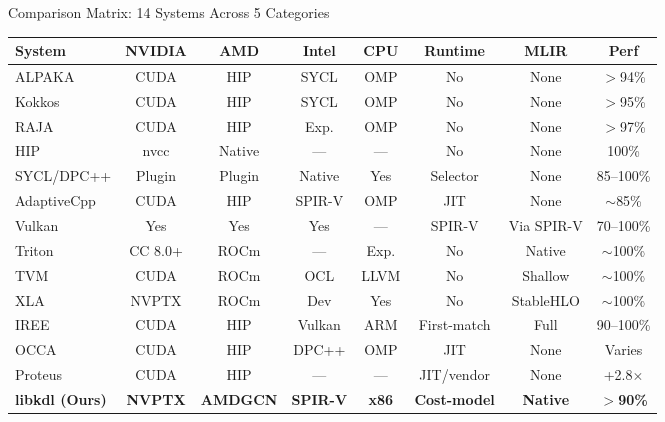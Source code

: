 \documentclass[aspectratio=169,10pt]{beamer}
\begin{document}
\begin{frame}{Comparison Matrix: 14 Systems Across 5 Categories}
  \begin{center}
  \begin{adjustbox}{max width=\textwidth,max height=0.78\textheight}
  \begin{tabular}{@{}l c c c c c c c@{}}
    \toprule
    \textbf{System} & \textbf{NVIDIA} & \textbf{AMD} & \textbf{Intel} & \textbf{CPU} & \textbf{Runtime} & \textbf{MLIR} & \textbf{Perf} \\
    \midrule

    ALPAKA       & CUDA     & HIP    & SYCL  & OMP   & No           & None    & $>$94\%  \\
    Kokkos       & CUDA     & HIP    & SYCL  & OMP   & No           & None    & $>$95\%  \\

    RAJA         & CUDA     & HIP    & Exp.  & OMP   & No           & None    & $>$97\%  \\
    HIP          & nvcc     & Native & ---   & ---   & No           & None    & 100\%  \\
    \midrule

    SYCL/DPC++   & Plugin   & Plugin & Native & Yes  & Selector     & None    & 85--100\% \\
    AdaptiveCpp  & CUDA     & HIP    & SPIR-V & OMP  & JIT          & None    & $\sim$85\%  \\

    Vulkan       & Yes      & Yes    & Yes   & ---   & SPIR-V       & Via SPIR-V & 70--100\% \\
    \midrule
    Triton       & CC 8.0+  & ROCm   & ---   & Exp.  & No           & Native  & $\sim$100\% \\

    TVM          & CUDA     & ROCm   & OCL   & LLVM  & No           & Shallow & $\sim$100\% \\
    XLA          & NVPTX    & ROCm   & Dev   & Yes   & No           & StableHLO & $\sim$100\% \\

    IREE         & CUDA     & HIP    & Vulkan & ARM  & First-match  & Full    & 90--100\% \\
    \midrule

    OCCA         & CUDA     & HIP    & DPC++ & OMP   & JIT          & None    & Varies \\
    Proteus      & CUDA     & HIP    & ---   & ---   & JIT/vendor   & None    & +2.8$\times$ \\
    \midrule

    \textbf{libkdl (Ours)} & \textbf{NVPTX} & \textbf{AMDGCN} & \textbf{SPIR-V} & \textbf{x86} & \textbf{Cost-model} & \textbf{Native} & \textbf{$>$90\%} \\
    \bottomrule
  \end{tabular}
  \end{adjustbox}
  \end{center}
\end{frame}
\end{document}

